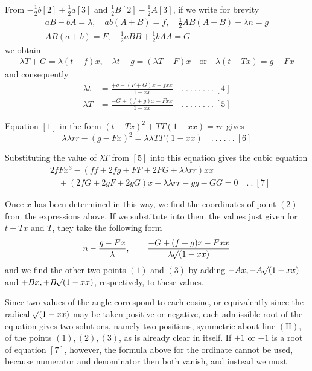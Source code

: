 %
From \(-\frac12b[2]+\frac12a[3]\) and \(\frac12B[2]-\frac12A[3]\), if we write for brevity
\[\begin{gathered}aB-bA=\lambda,\quad ab(A+B)=f,\quad\tfrac12AB(A+B)+\lambda n=g\\
AB(a+b)=F,\quad\tfrac12aBB+\tfrac12bAA=G\end{gathered}\]
we obtain
\[\begin{gathered}\lambda T+G=\lambda(t+f)x,\quad\lambda t-g=(\lambda T-F)x\quad\text{or}\quad\lambda(t-Tx)=g-Fx\end{gathered}\]
and consequently
\[\begin{aligned}\lambda t&=\frac{+g-(F+G)x+fxx}{1-xx}\quad.\ .\ .\ .\ .\ .\ .\ .\ [4]\\
\lambda T&=\frac{-G+(f+g)x-Fxx}{1-xx}\quad.\ .\ .\ .\ .\ .\ .\ .\ [5]\end{aligned}\]
\par
Equation \([1]\) in the form \((t-Tx)^2+TT(1-xx)=rr\) gives
\[\lambda\lambda rr-(g-Fx)^2=\lambda\lambda TT(1-xx)\quad.\ .\ .\ .\ .\ .\ [6]\]
\par
Substituting the value of \(\lambda T\) from \([5]\) into this equation gives the cubic equation
\[\begin{aligned}&2fFx^3-(ff+2fg+FF+2FG+\lambda\lambda rr)xx\\
&\quad+(2fG+2gF+2gG)x+\lambda\lambda rr-gg-GG=0\quad.\ .\ [7]\end{aligned}\]
\par
Once \(x\) has been determined in this way, we find the coordinates of point \((2)\) from the expressions above. If we substitute into them the values just given for \(t-Tx\) and \(T\), they take the following form
\[n-\frac{g-Fx}{\lambda},\qquad\frac{-G+(f+g)x-Fxx}{\lambda\mathord{{}^{}\!\surd}(1-xx)}\]
and we find the other two points \((1)\) and \((3)\) by adding \(-Ax,-A\mathord{{}^{}\!\surd}(1-xx)\) and \(+Bx,+B\mathord{{}^{}\!\surd}(1-xx)\), respectively, to these values.

Since two values of the angle correspond to each cosine, or equivalently since the radical \(\mathord{{}^{}\!\surd}(1-xx)\) may be taken positive or negative, each admissible root of the equation gives two solutions, namely two positions, symmetric about line \(\mathrm{(II)}\), of the points \((1),(2),(3)\), as is already clear in itself. If \(+1\) or \(-1\) is a root of equation \([7]\), however, the formula above for the ordinate cannot be used, because numerator and denominator then both vanish, and instead we must
